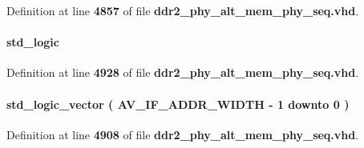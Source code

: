 Definition at line {\bf 4857} of file {\bf ddr2\+\_\+phy\+\_\+alt\+\_\+mem\+\_\+phy\+\_\+seq.\+vhd}.

\paragraph[{int\+\_\+ac\+\_\+1t\+\_\+r}]{ {\bfseries \textcolor{comment}{std\+\_\+logic}\textcolor{vhdlchar}{ }} \hspace{0.3cm}{\ttfamily [Signal]}}\label{classddr2__phy__alt__mem__phy__mmi_1_1struct_acdf09c597016b882b121aed38e5c8dbc}


Definition at line {\bf 4928} of file {\bf ddr2\+\_\+phy\+\_\+alt\+\_\+mem\+\_\+phy\+\_\+seq.\+vhd}.

\paragraph[{int\+\_\+address}]{ {\bfseries \textcolor{comment}{std\+\_\+logic\+\_\+vector}\textcolor{vhdlchar}{ }\textcolor{vhdlchar}{(}\textcolor{vhdlchar}{ }\textcolor{vhdlchar}{ }\textcolor{vhdlchar}{ }\textcolor{vhdlchar}{ }{\bfseries {\bf A\+V\+\_\+\+I\+F\+\_\+\+A\+D\+D\+R\+\_\+\+W\+I\+D\+TH}} \textcolor{vhdlchar}{-\/}\textcolor{vhdlchar}{ } \textcolor{vhdldigit}{1} \textcolor{vhdlchar}{ }\textcolor{keywordflow}{downto}\textcolor{vhdlchar}{ }\textcolor{vhdlchar}{ } \textcolor{vhdldigit}{0} \textcolor{vhdlchar}{ }\textcolor{vhdlchar}{)}\textcolor{vhdlchar}{ }} \hspace{0.3cm}{\ttfamily [Signal]}}\label{classddr2__phy__alt__mem__phy__mmi_1_1struct_a698b09799d4a35c1781c7d06c107a2a9}


Definition at line {\bf 4908} of file {\bf ddr2\+\_\+phy\+\_\+alt\+\_\+mem\+\_\+phy\+\_\+seq.\+vhd}.

